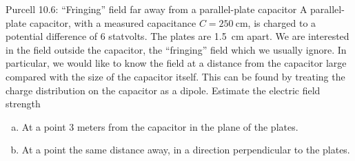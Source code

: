 \documentclass{esg8022pset}
\begin{document}
\begin{problem}{Purcell 10.6: ``Fringing'' field far away from a parallel-plate capacitor}
  A parallel-plate capacitor, with a measured capacitance $C = \SI{250}{\centi\meter}$,
  is charged to a potential difference of 6 statvolts. The plates 
  are \SI{1.5}{\centi\meter} apart. We are interested in the field outside the capacitor,
  the ``fringing'' field which we usually ignore. In particular, we would 
  like to know the field at a distance from the capacitor large compared 
  with the size of the capacitor itself. This can be found by treating the 
  charge distribution on the capacitor as a dipole. Estimate the electric 
  field strength 
  \begin{enumerate}[(a)]
    \item At a point 3 meters from the capacitor in the plane of the plates. 
    \item At a point the same distance away, in a direction perpendicular to the plates. 
  \end{enumerate}
\end{problem}
\begin{solution}

\end{solution}
\end{document}
